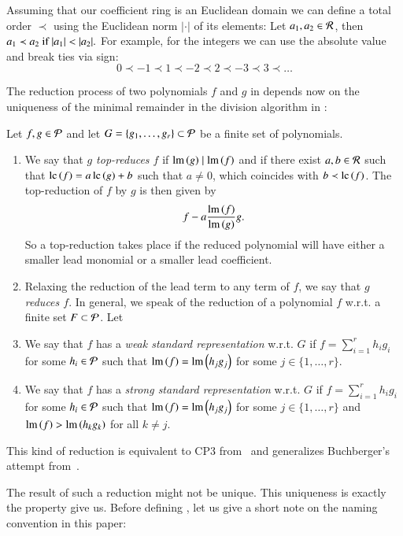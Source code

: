 Assuming that our coefficient ring \er is an Euclidean domain we can define a total
order $\prec$ using the Euclidean norm $|\cdot|$ of its elements: Let $a_1, a_2
\in \mathcal{R}$, then $a_1 \prec a_2 \text{ if } |a_1 | < | a_2 |.$
For example, for the integers we can use the absolute value and break ties via
sign:
\[0\prec -1 \prec 1 \prec -2 \prec 2 \prec -3 \prec 3 \prec \ldots \]

The reduction process of two polynomials $f$ and $g$ in \epr depends now on the
uniqueness of the minimal remainder in the division algorithm in \er:

\begin{definition}
\label{def:reduction}
Let $f, g \in \mathcal{P}$ and let $G= \{g_1,\ldots,g_r\} \subset \mathcal{P}$ be a finite set of
polynomials.
\begin{enumerate}
\item We say that \emph{$g$ top-reduces $f$} if $\operatorname{lm}\left({g}\right) \mid \operatorname{lm}\left({f}\right)$ and if there exist
$a,b \in \mathcal{R}$ such that $\mathrm{lc}\left({f}\right) = a\, \mathrm{lc}\left({g}\right) +b$ such
that $a \neq 0$, which coincides with $b \prec \mathrm{lc}\left({f}\right)$. The top-reduction of $f$
by $g$ is then given by
\[f - a \frac{\operatorname{lm}\left({f}\right)}{\operatorname{lm}\left({g}\right)} g.\]
So a top-reduction takes place if the reduced polynomial will have either a smaller lead
monomial or a smaller lead coefficient.
\item Relaxing the reduction of the lead term to any term of $f$, we say
that \emph{$g$ reduces $f$}. In general, we speak of the reduction of a
polynomial $f$ w.r.t. a finite set $F\subset \mathcal{P}$.
Let 
\item We say that $f$ has a \emph{weak standard representation} w.r.t. $G$ if
$f = \sum_{i=1}^r h_i g_i$ for some $h_i \in \mathcal{P}$ such that $\operatorname{lm}\left({f}\right) = \operatorname{lm}\left({h_j
  g_j}\right)$ for some $j \in \{1,\ldots,r\}$.
\item We say that $f$ has a \emph{strong standard representation} w.r.t. $G$ if
$f = \sum_{i=1}^r h_i g_i$ for some $h_i \in \mathcal{P}$ such that $\operatorname{lm}\left({f}\right) = \operatorname{lm}\left({h_j
  g_j}\right)$ for some $j \in \{1,\ldots,r\}$ and $\operatorname{lm}\left({f}\right) > \operatorname{lm}\left({h_k g_k}\right)$ for all $k
  \neq j$.
\end{enumerate}
\end{definition}

This kind of reduction is equivalent to CP3 from~\cite{kapur-cp3} and generalizes
Buchberger's attempt from~\cite{buchberger2ndCriterion1985}.

The result of such a reduction might not be unique. This uniqueness is exactly
the property \emph{\stbs} give us. Before defining \stbs, let us give a short note on
the naming convention in this paper:

